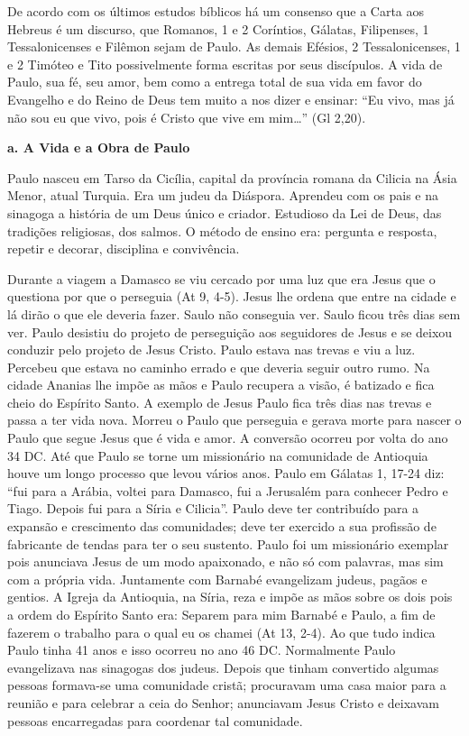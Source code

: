 \documentclass[
]{book}
\begin{document}
De acordo com os últimos estudos bíblicos há um consenso que a Carta aos Hebreus é um discurso, que Romanos, 1 e 2 Coríntios, Gálatas, Filipenses, 1 Tessalonicenses e Filêmon sejam de Paulo. As demais Efésios, 2 Tessalonicenses, 1 e 2 Timóteo e Tito possivelmente forma escritas por seus discípulos. A vida de Paulo, sua fé, seu amor, bem como a entrega total de sua vida em favor do Evangelho e do Reino de Deus tem muito a nos dizer e ensinar: ``Eu vivo, mas já não sou eu que vivo, pois é Cristo que vive em mim\ldots{}'' (Gl 2,20).

\textbf{a. A Vida e a Obra de Paulo}

Paulo nasceu em Tarso da Cicília, capital da província romana da Cilicia na Ásia Menor, atual Turquia. Era um judeu da Diáspora. Aprendeu com os pais e na sinagoga a história de um Deus único e criador. Estudioso da Lei de Deus, das tradições religiosas, dos salmos. O método de ensino era: pergunta e resposta, repetir e decorar, disciplina e convivência.

Durante a viagem a Damasco se viu cercado por uma luz que era Jesus que o questiona por que o perseguia (At 9, 4-5). Jesus lhe ordena que entre na cidade e lá dirão o que ele deveria fazer. Saulo não conseguia ver. Saulo ficou três dias sem ver. Paulo desistiu do projeto de perseguição aos seguidores de Jesus e se deixou conduzir pelo projeto de Jesus Cristo. Paulo estava nas trevas e viu a luz. Percebeu que estava no caminho errado e que deveria seguir outro rumo. Na cidade Ananias lhe impõe as mãos e Paulo recupera a visão, é batizado e fica cheio do Espírito Santo. A exemplo de Jesus Paulo fica três dias nas trevas e passa a ter vida nova. Morreu o Paulo que perseguia e gerava morte para nascer o Paulo que segue Jesus que é vida e amor. A conversão ocorreu por volta do ano 34 DC. Até que Paulo se torne um missionário na comunidade de Antioquia houve um longo processo que levou vários anos. Paulo em Gálatas 1, 17-24 diz: ``fui para a Arábia, voltei para Damasco, fui a Jerusalém para conhecer Pedro e Tiago. Depois fui para a Síria e Cilicia''. Paulo deve ter contribuído para a expansão e crescimento das comunidades; deve ter exercido a sua profissão de fabricante de tendas para ter o seu sustento. Paulo foi um missionário exemplar pois anunciava Jesus de um modo apaixonado, e não só com palavras, mas sim com a própria vida. Juntamente com Barnabé evangelizam judeus, pagãos e gentios. A Igreja da Antioquia, na Síria, reza e impõe as mãos sobre os dois pois a ordem do Espírito Santo era: Separem para mim Barnabé e Paulo, a fim de fazerem o trabalho para o qual eu os chamei (At 13, 2-4). Ao que tudo indica Paulo tinha 41 anos e isso ocorreu no ano 46 DC. Normalmente Paulo evangelizava nas sinagogas dos judeus. Depois que tinham convertido algumas pessoas formava-se uma comunidade cristã; procuravam uma casa maior para a reunião e para celebrar a ceia do Senhor; anunciavam Jesus Cristo e deixavam pessoas encarregadas para coordenar tal comunidade.
\end{document}
